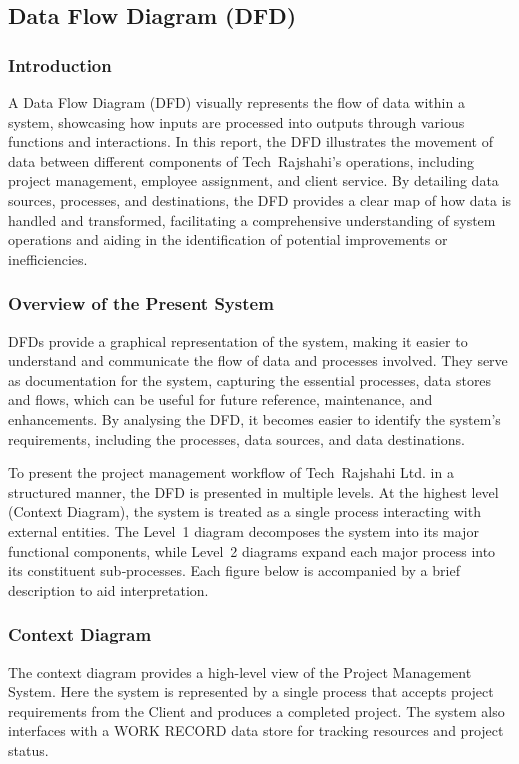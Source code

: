 \documentclass[12pt,a4paper]{article}
\newcommand{\company}[1]{#1}
\begin{document}
\subsection{Data Flow Diagram (DFD)}
\subsubsection{Introduction}
A Data Flow Diagram (DFD) visually represents the flow of data within a system, showcasing how inputs are processed into outputs through various functions and interactions.  In this report, the DFD illustrates the movement of data between different components of Tech Rajshahi’s operations, including project management, employee assignment, and client service.  By detailing data sources, processes, and destinations, the DFD provides a clear map of how data is handled and transformed, facilitating a comprehensive understanding of system operations and aiding in the identification of potential improvements or inefficiencies.

\subsubsection{Overview of the Present System}
DFDs provide a graphical representation of the system, making it easier to understand and communicate the flow of data and processes involved.  They serve as documentation for the system, capturing the essential processes, data stores and flows, which can be useful for future reference, maintenance, and enhancements.  By analysing the DFD, it becomes easier to identify the system’s requirements, including the processes, data sources, and data destinations.

To present the project management workflow of \company{Tech Rajshahi Ltd.} in a structured manner, the DFD is presented in multiple levels.  At the highest level (Context Diagram), the system is treated as a single process interacting with external entities.  The Level~1 diagram decomposes the system into its major functional components, while Level~2 diagrams expand each major process into its constituent sub‑processes.  Each figure below is accompanied by a brief description to aid interpretation.

\newpage
\subsubsection{Context Diagram}
\noindent
The context diagram provides a high-level view of the Project Management System.  Here the system is represented by a single process that accepts project requirements from the Client and produces a completed project. The system also interfaces with a WORK RECORD data store for tracking resources and project status.
\end{document}
